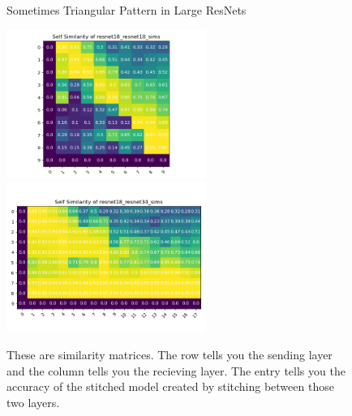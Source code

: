 \documentclass{article} %
\begin{document}
\begin{center}
   \begin{figure}[h!]
      \centering
      \caption{Sometimes Triangular Pattern in Large ResNets}
      \includegraphics[width=6.5cm]{resnet18_resnet18_sims.png}
      \includegraphics[width=6.5cm]{resnet18_resnet34_sims.png}
      \caption*{These are similarity matrices. The row tells you the sending layer and the column tells you the recieving layer.
      The entry tells you the accuracy of the stitched model created by stitching between those two layers.}
   \end{figure}
\end{center}

\end{document}

